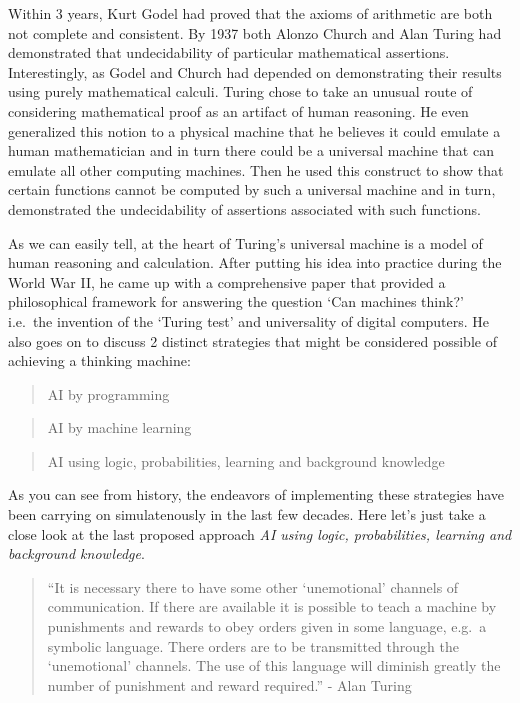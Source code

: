 \documentclass[]{book}
\theoremstyle{definition}
\theoremstyle{definition}
\theoremstyle{definition}
\theoremstyle{remark}
\begin{document}
Within 3 years, Kurt Godel had proved that the axioms of arithmetic are
both not complete and consistent. By 1937 both Alonzo Church and Alan
Turing had demonstrated that undecidability of particular mathematical
assertions. Interestingly, as Godel and Church had depended on
demonstrating their results using purely mathematical calculi. Turing
chose to take an unusual route of considering mathematical proof as an
artifact of human reasoning. He even generalized this notion to a
physical machine that he believes it could emulate a human mathematician
and in turn there could be a universal machine that can emulate all
other computing machines. Then he used this construct to show that
certain functions cannot be computed by such a universal machine and in
turn, demonstrated the undecidability of assertions associated with such
functions.

As we can easily tell, at the heart of Turing's universal machine is a
model of human reasoning and calculation. After putting his idea into
practice during the World War II, he came up with a comprehensive paper
that provided a philosophical framework for answering the question `Can
machines think?' i.e.~the invention of the `Turing test' and
universality of digital computers. He also goes on to discuss 2 distinct
strategies that might be considered possible of achieving a thinking
machine:

\begin{quote}
AI by programming
\end{quote}

\begin{quote}
AI by machine learning
\end{quote}

\begin{quote}
AI using logic, probabilities, learning and background knowledge
\end{quote}

As you can see from history, the endeavors of implementing these
strategies have been carrying on simulatenously in the last few decades.
Here let's just take a close look at the last proposed approach \emph{AI
using logic, probabilities, learning and background knowledge}.

\begin{quote}
``It is necessary there to have some other `unemotional' channels of
communication. If there are available it is possible to teach a machine
by punishments and rewards to obey orders given in some language, e.g.~a
symbolic language. There orders are to be transmitted through the
`unemotional' channels. The use of this language will diminish greatly
the number of punishment and reward required.'' - Alan Turing
\end{quote}
\end{document}
